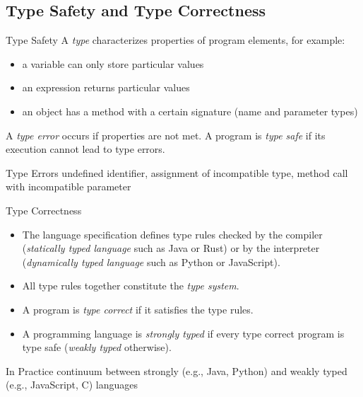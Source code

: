\subsection{Type Safety and Type Correctness}
\begin{frame}{\insertsubsection}
	\begin{fancycolumns}[widths={45}]
		\begin{definition}{Type Safety}
			A \emph{type} characterizes properties of program elements, for example:
			\begin{itemize}
				\item a variable can only store particular values
				\item an expression returns particular values
				\item an object has a method with a certain signature (name and parameter types)
			\end{itemize}
			
			A \emph{type error} occurs if properties are not met. A program is \emph{type safe} if its execution cannot lead to type errors.
		\end{definition}
		\begin{example}{Type Errors}
			undefined identifier, assignment of incompatible type, method call with incompatible parameter
		\end{example}
		\nextcolumn
		\begin{definition}{Type Correctness}
			\begin{itemize}
				\item The language specification defines type rules checked by the compiler (\emph{statically typed language} such as Java or Rust) or by the interpreter (\emph{dynamically typed language} such as Python or JavaScript).
				\item All type rules together constitute the \emph{type system}.
				\item A program is \emph{type correct} if it satisfies the type rules.
				\item A programming language is \emph{strongly typed} if every type correct program is type safe (\emph{weakly typed} otherwise).
			\end{itemize}
		\end{definition}
		\begin{example}{In Practice}
			continuum between strongly (e.g., Java, Python) and weakly typed (e.g., JavaScript, C) languages
		\end{example}
	\end{fancycolumns}
\end{frame}